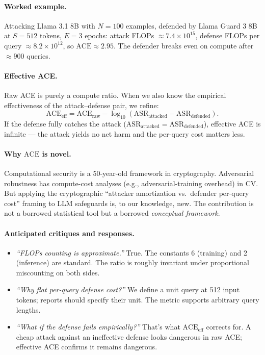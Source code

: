 \documentclass[11pt,letterpaper]{article}
\newcommand{\ACE}{\mathrm{ACE}}
\newcommand{\ASR}{\mathrm{ASR}}
\begin{document}
\paragraph{Worked example.} Attacking Llama 3.1 8B with $N=100$ examples,
defended by Llama Guard 3 8B at $S=512$ tokens, $E=3$ epochs:
attack FLOPs $\approx 7.4 \times 10^{15}$, defense FLOPs per query
$\approx 8.2 \times 10^{12}$, so $\ACE \approx 2.95$. The defender breaks
even on compute after $\approx 900$ queries.

\paragraph{Effective ACE.} Raw ACE is purely a compute ratio. When we
also know the empirical effectiveness of the attack--defense pair, we
refine:
\[
  \ACE_{\text{eff}} = \ACE_{\text{raw}} - \log_{10}(\ASR_{\text{attacked}} - \ASR_{\text{defended}}).
\]
If the defense fully catches the attack ($\ASR_{\text{attacked}} =
\ASR_{\text{defended}}$), effective ACE is infinite — the attack yields
no net harm and the per-query cost matters less.

\paragraph{Why $\ACE$ is novel.} Computational security is a
50-year-old framework in cryptography. Adversarial robustness has
compute-cost analyses (e.g., adversarial-training overhead) in CV. But
applying the cryptographic ``attacker amortization vs.\ defender per-query
cost'' framing to LLM safeguards is, to our knowledge, new. The contribution
is not a borrowed statistical tool but a borrowed \emph{conceptual
framework}.

\paragraph{Anticipated critiques and responses.}
\begin{itemize}
  \item \emph{``FLOPs counting is approximate.''} True. The constants 6
        (training) and 2 (inference) are standard. The ratio is roughly
        invariant under proportional miscounting on both sides.
  \item \emph{``Why flat per-query defense cost?''} We define a unit
        query at 512 input tokens; reports should specify their unit.
        The metric supports arbitrary query lengths.
  \item \emph{``What if the defense fails empirically?''} That's what
        $\ACE_{\text{eff}}$ corrects for. A cheap attack against an
        ineffective defense looks dangerous in raw ACE; effective ACE
        confirms it remains dangerous.
\end{itemize}
\end{document}

